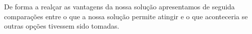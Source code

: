 De forma a realçar as vantagens da nossa solução apresentamos de seguida comparações entre o que a nossa solução permite atingir e o que aconteceria se outras opções tivessem sido tomadas.





